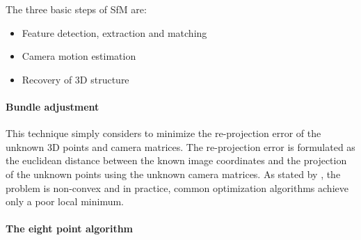         	The three basic steps of SfM are:
        	\begin{itemize}
        		\item Feature detection, extraction and matching
        		\item Camera motion estimation
        		\item Recovery of 3D structure
        	\end{itemize}
        	
        	\paragraph{Bundle adjustment} 
        		This technique simply considers to minimize the re-projection error of the unknown 3D points and camera matrices.
        		The re-projection error is formulated as the euclidean distance between the known image coordinates and the projection of the unknown points using the unknown camera matrices.
        		As stated by \cite{survey2017}, the problem is non-convex and in practice, common optimization algorithms achieve only a poor local minimum.
        		
        	\paragraph{The eight point algorithm}
        	
